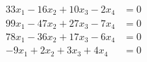\begin{align*}
33x_1  - 16x_2 + 10x_3 - 2x_4 &= 0 \\
99x_1 - 47x_2 + 27x_3 - 7x_4 &=  0 \\
78x_1 - 36x_2 + 17x_3 - 6x_4 &=  0 \\  
-9x_1 + 2x_2 + 3x_3 +4x_4 &=  0 
\end{align*}